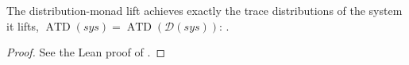 \begin{theorem}
  \label{thm:dist-eq}
  \leanok
  The distribution-monad lift achieves exactly the trace distributions of the system it lifts, $\operatorname{ATD}(sys) = \operatorname{ATD}(\mathcal{D}(sys))$: .
\end{theorem}

\begin{proof}\leanok
  See the Lean proof of .
\end{proof}
